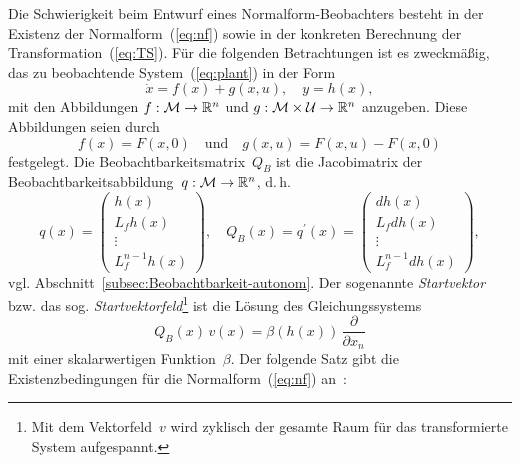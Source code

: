 Die Schwierigkeit beim Entwurf eines Normalform-Beobachters besteht
in der Existenz der Normalform~(\ref{eq:nf}) sowie in der konkreten
Berechnung der Transformation~(\ref{eq:TS}). Für die folgenden Betrachtungen
ist es zweckmäßig, das zu beobachtende System~(\ref{eq:plant}) in
der Form 
\begin{equation}
\dot{x}=f(x)+g(x,u),\quad y=h(x),\label{eq:plant-fg}
\end{equation}
mit den Abbildungen $f:\mathcal{M}\to{\mathbb{R}}^{n}$ und $g:\mathcal{M}\times\mathcal{U}\to{\mathbb{R}}^{n}$
anzugeben. Diese Abbildungen seien durch 
\[
f(x)=F(x,0)\quad\mbox{und}\quad g(x,u)=F(x,u)-F(x,0)
\]
festgelegt. Die Beobachtbarkeitsmatrix~$Q_{B}$
ist die Jacobimatrix der Beobachtbarkeitsabbildung~$q:\mathcal{M}\to{\mathbb{R}}^{n}$,
d.\,h. 
\begin{equation}
q(x)=\left(\begin{array}{c}
h(x)\\
L_{f}h(x)\\
\vdots\\
L_{f}^{n-1}h(x)
\end{array}\right),\quad Q_{B}(x)=q^{\prime}(x)=\left(\begin{array}{c}
dh(x)\\
L_{f}dh(x)\\
\vdots\\
L_{f}^{n-1}dh(x)
\end{array}\right),\label{eq:Q}
\end{equation}
vgl. Abschnitt~\ref{subsec:Beobachtbarkeit-autonom}. Der sogenannte
\emph{Start\-vektor} bzw. das sog. \emph{Start\-vektor\-feld}\footnote{Mit dem Vektorfeld~$v$ wird zyklisch der gesamte Raum für das transformierte
System aufgespannt.} ist die Lösung des Gleichungssystems
\begin{equation}
Q_{B}(x)\,v(x)=\beta(h(x))\,\frac{\partial}{\partial x_{n}}\label{eq:v}
\end{equation}
mit einer skalarwertigen Funktion~$\beta$. Der folgende Satz gibt
die Existenzbedingungen für die Normalform~(\ref{eq:nf}) an~\cite{krener83,marino1990}:
